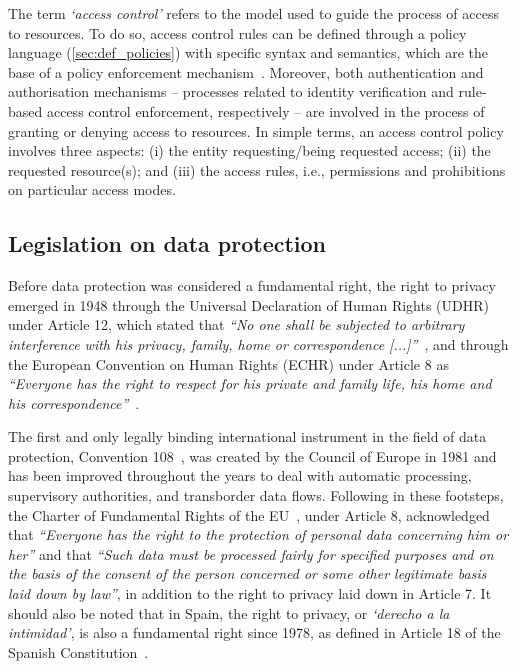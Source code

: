 The term \textit{`access control'} refers to the model used to guide the process of access to resources.
To do so, access control rules can be defined through a policy language (\ref{sec:def_policies}) with specific syntax and semantics, which are the base of a policy enforcement mechanism~\citep{cuenca_grau_access_2017}. 
Moreover, both authentication and authorisation mechanisms -- processes related to identity verification and rule-based access control enforcement, respectively -- are involved in the process of granting or denying access to resources.
In simple terms, an access control policy involves three aspects:
(i) the entity requesting/being requested access;
(ii) the requested resource(s); and 
(iii) the access rules, i.e., permissions and prohibitions on particular access modes.

\subsection{Legislation on data protection}
\label{sec:def_data_protection_law}

Before data protection was considered a fundamental right, the right to privacy emerged in 1948 through the Universal Declaration of Human Rights (UDHR) under Article 12, which stated that \textit{``No one shall be subjected to arbitrary interference with his privacy, family, home or correspondence [...]''}~\citep{united_nations_general_assembly_universal_1948}, and through the European Convention on Human Rights (ECHR) under Article 8 as \textit{``Everyone has the right to respect for his private and family life, his home and his correspondence''}~\citep{council_of_europe_european_1950}.

The first and only legally binding international instrument in the field of data protection, Convention 108~\citep{council_of_europe_convention_1981}, was created by the Council of Europe in 1981 and has been improved throughout the years to deal with automatic processing, supervisory authorities, and transborder data flows.
Following in these footsteps, the Charter of Fundamental Rights of the EU~\citeyearpar{noauthor_charter_2000}, under Article 8, acknowledged that \textit{``Everyone has the right to the protection of personal data concerning him or her''} and that \textit{``Such data must be processed fairly for specified purposes and on the basis of the consent of the person concerned or some other legitimate basis laid down by law''}, in addition to the right to privacy laid down in Article 7.
It should also be noted that in Spain, the right to privacy, or \textit{`derecho a la intimidad'}, is also a fundamental right since 1978, as defined in Article 18 of the Spanish Constitution~\citeyearpar{noauthor_constitucion_1978}.

